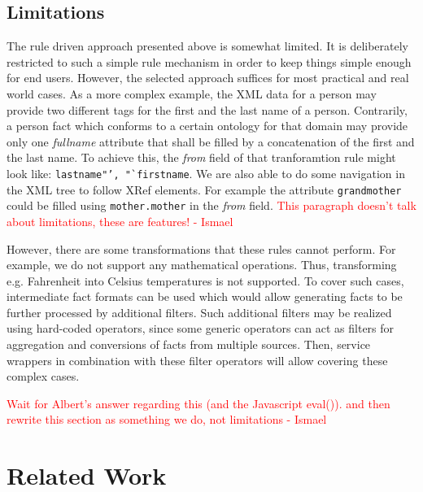 \documentclass{fast_latex}
\begin{document}

\subsection{Limitations} %
\label{sub:limitations}

The rule driven approach presented above is somewhat limited. It is deliberately restricted to such a simple rule mechanism in order to keep things simple enough for end users. However, the selected approach suffices for most practical and real world cases. As a more complex example, the XML data for a person may provide two different tags for the first and the last name of a person. Contrarily, a person fact which conforms to a certain ontology for that domain may provide only one \emph{fullname} attribute that shall be filled by a concatenation of the first and the last name. To achieve this, the \textit{from} field of that tranforamtion rule might look like: \texttt{lastname"', "`firstname}. We are also able to do some navigation in the XML tree to follow XRef elements. For example the attribute \texttt{grandmother} could be filled using \texttt{mother.mother} in the \textit{from} field.
\textcolor{red}{This paragraph doesn't talk about limitations, these are features! - Ismael} 

However, there are some transformations that these rules cannot perform. For example, we do not support any mathematical operations. Thus, transforming e.g. Fahrenheit into Celsius temperatures is not supported. To cover such cases, intermediate fact formats can be used which would allow generating facts to be further processed by additional filters. Such additional filters may be realized using hard-coded operators, since some generic operators can act as filters for aggregation and conversions of facts from multiple sources. Then, service wrappers in combination with these filter operators will allow covering these complex cases.

\textcolor{red}{Wait for Albert's answer regarding this (and the Javascript eval()). and then rewrite this section as something we do, not limitations - Ismael} 




\clearpage
\section{Related Work} %
\label{sec:related_work}
\end{document}
